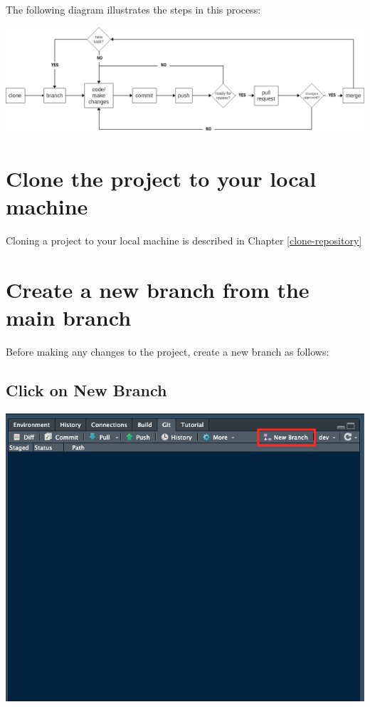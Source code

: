 \documentclass[
  12pt,
]{book}
\begin{document}
The following diagram illustrates the steps in this process:

\includegraphics{images/git_process1.png}

\hypertarget{clone-the-project-to-your-local-machine}{%
\section{Clone the project to your local machine}\label{clone-the-project-to-your-local-machine}}

Cloning a project to your local machine is described in Chapter \ref{clone-repository}

\hypertarget{create-a-new-branch-from-the-main-branch}{%
\section{Create a new branch from the main branch}\label{create-a-new-branch-from-the-main-branch}}

Before making any changes to the project, create a new branch as follows:

\hypertarget{click-on-new-branch}{%
\subsection{\texorpdfstring{Click on \textbf{New Branch}}{Click on New Branch}}\label{click-on-new-branch}}

\includegraphics{images/git_branch1.png}
\end{document}
